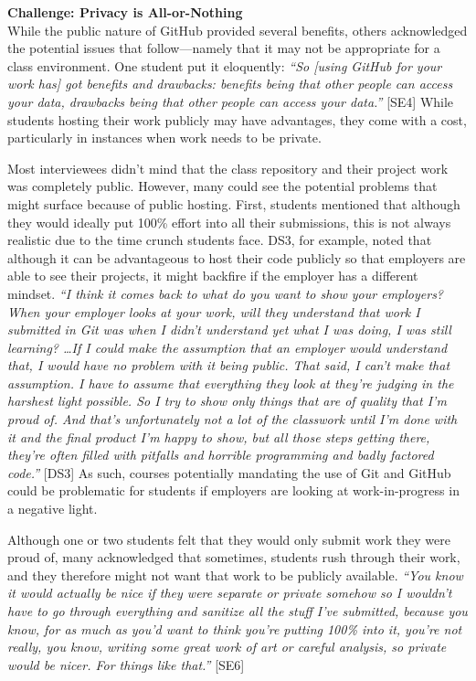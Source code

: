 \textbf{Challenge: Privacy is All-or-Nothing} \\
While the public nature of GitHub provided several benefits, others acknowledged the potential issues that follow---namely that it may not be appropriate for a class environment. One student put it eloquently: \textit{``So [using GitHub for your work has] got benefits and drawbacks: benefits being that other people can access your data, drawbacks being that other people can access your data.''} [SE4] While students hosting their work publicly may have advantages, they come with a cost, particularly in instances when work needs to be private.

Most interviewees didn't mind that the class repository and their project work was completely public. However, many could see the potential problems that might surface because of public hosting. First, students mentioned that although they would ideally put 100\% effort into all their submissions, this is not always realistic due to the time crunch students face. DS3, for example, noted that although it can be advantageous to host their code publicly so that employers are able to see their projects, it might backfire if the employer has a different mindset. \textit{``I think it comes back to what do you want to show your employers? When your employer looks at your work, will they understand that work I submitted in Git was when I didn't understand yet what I was doing, I was still learning? \ldots If I could make the assumption that an employer would understand that, I would have no problem with it being public. That said, I can't make that assumption. I have to assume that everything they look at they're judging in the harshest light possible. So I try to show only things that are of quality that I'm proud of. And that's unfortunately not a lot of the classwork until I'm done with it and the final product I'm happy to show, but all those steps getting there, they're often filled with pitfalls and horrible programming and badly factored code.''} [DS3] As such, courses potentially mandating the use of Git and GitHub could be problematic for students if employers are looking at work-in-progress in a negative light.

Although one or two students felt that they would only submit work they were proud of, many acknowledged that sometimes, students rush through their work, and they therefore might not want that work to be publicly available. \textit{``You know it would actually be nice if they were separate or private somehow so I wouldn't have to go through everything and sanitize all the stuff I've submitted, because you know, for as much as you'd want to think you're putting 100\% into it, you're not really, you know, writing some great work of art or careful analysis, so private would be nicer. For things like that.''} [SE6]

